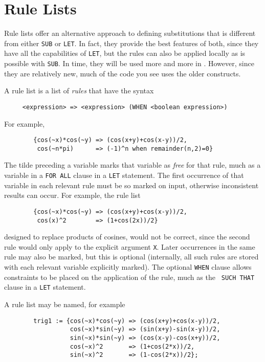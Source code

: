 \section{Rule Lists} 

Rule lists offer an alternative approach to defining substitutions that is
different from either {\tt SUB} or {\tt LET}.  In fact, they provide the
best features of both, since they have all the capabilities of {\tt LET},
but the rules can also be applied locally as is possible with {\tt SUB}.
In time, they will be used more and more in {\REDUCE}.  However, since they
are relatively new, much of the {\REDUCE} code you see uses the older
constructs.

A rule list is a list of {\em rules\/} that have the syntax
\begin{verbatim}
     <expression> => <expression> (WHEN <boolean expression>)
\end{verbatim}
For example,
\begin{verbatim}
        {cos(~x)*cos(~y) => (cos(x+y)+cos(x-y))/2,
         cos(~n*pi)      => (-1)^n when remainder(n,2)=0}
\end{verbatim}

The tilde preceding a variable marks that variable as {\em free\/} for that
rule, much as a variable in a {\tt FOR ALL} clause in a {\tt LET}
statement.  The first occurrence of that variable in each relevant rule
must be so marked on input, otherwise inconsistent results can occur.
For example, the rule list
\begin{verbatim}
        {cos(~x)*cos(~y) => (cos(x+y)+cos(x-y))/2,
         cos(x)^2        => (1+cos(2x))/2}
\end{verbatim}
designed to replace products of cosines, would not be correct, since the
second rule would only apply to the explicit argument {\tt X}.  Later
occurrences in the same rule may also be marked, but this is optional
(internally, all such rules are stored with each relevant variable
explicitly marked).  The optional {\tt WHEN} clause allows
constraints to be placed on the application of the rule, much as the {\tt
SUCH THAT} clause in a {\tt LET} statement.

A rule list may be named, for example
\begin{verbatim}
        trig1 := {cos(~x)*cos(~y) => (cos(x+y)+cos(x-y))/2,
                  cos(~x)*sin(~y) => (sin(x+y)-sin(x-y))/2,
                  sin(~x)*sin(~y) => (cos(x-y)-cos(x+y))/2,
                  cos(~x)^2       => (1+cos(2*x))/2,
                  sin(~x)^2       => (1-cos(2*x))/2};
\end{verbatim}

